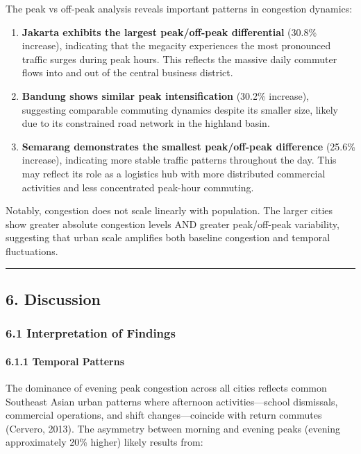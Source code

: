 \documentclass[
  12pt,
]{article}
\begin{document}
The peak vs off-peak analysis reveals important patterns in congestion dynamics:

\begin{enumerate}
\def\labelenumi{\arabic{enumi}.}
\item
  \textbf{Jakarta exhibits the largest peak/off-peak differential} (30.8\% increase), indicating that the megacity experiences the most pronounced traffic surges during peak hours. This reflects the massive daily commuter flows into and out of the central business district.
\item
  \textbf{Bandung shows similar peak intensification} (30.2\% increase), suggesting comparable commuting dynamics despite its smaller size, likely due to its constrained road network in the highland basin.
\item
  \textbf{Semarang demonstrates the smallest peak/off-peak difference} (25.6\% increase), indicating more stable traffic patterns throughout the day. This may reflect its role as a logistics hub with more distributed commercial activities and less concentrated peak-hour commuting.
\end{enumerate}

Notably, congestion does not scale linearly with population. The larger cities show greater absolute congestion levels AND greater peak/off-peak variability, suggesting that urban scale amplifies both baseline congestion and temporal fluctuations.

\begin{center}\rule{0.5\linewidth}{0.5pt}\end{center}

\subsection{6. Discussion}\label{discussion}

\subsubsection{6.1 Interpretation of Findings}\label{interpretation-of-findings}

\paragraph{6.1.1 Temporal Patterns}\label{temporal-patterns-1}

The dominance of evening peak congestion across all cities reflects common Southeast Asian urban patterns where afternoon activities---school dismissals, commercial operations, and shift changes---coincide with return commutes (Cervero, 2013). The asymmetry between morning and evening peaks (evening approximately 20\% higher) likely results from:
\end{document}
